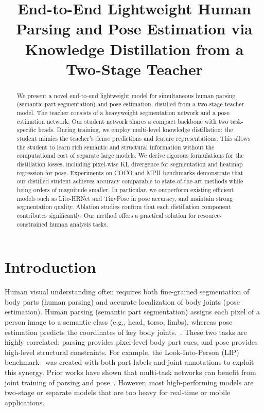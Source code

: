 \documentclass{article}
\begin{document}
\title{End-to-End Lightweight Human Parsing and Pose Estimation via Knowledge Distillation from a Two-Stage Teacher}
\maketitle

\begin{abstract}
We present a novel end-to-end lightweight model for simultaneous human parsing (semantic part segmentation) and pose estimation, distilled from a two-stage teacher model. The teacher consists of a heavyweight segmentation network and a pose estimation network. Our student network shares a compact backbone with two task-specific heads. During training, we employ multi-level knowledge distillation: the student mimics the teacher’s dense predictions and feature representations. This allows the student to learn rich semantic and structural information without the computational cost of separate large models. We derive rigorous formulations for the distillation losses, including pixel-wise KL divergence for segmentation and heatmap regression for pose. Experiments on COCO and MPII benchmarks demonstrate that our distilled student achieves accuracy comparable to state-of-the-art methods while being orders of magnitude smaller. In particular, we outperform existing efficient models such as Lite-HRNet and TinyPose in pose accuracy, and maintain strong segmentation quality. Ablation studies confirm that each distillation component contributes significantly. Our method offers a practical solution for resource-constrained human analysis tasks.
\end{abstract}

\section{Introduction}
Human visual understanding often requires both fine-grained segmentation of body parts (human parsing) and accurate localization of body joints (pose estimation). Human parsing (semantic part segmentation) assigns each pixel of a person image to a semantic class (e.g., head, torso, limbs), whereas pose estimation predicts the coordinates of key body joints.~\cite{liang2018lip}. These two tasks are highly correlated: parsing provides pixel-level body part cues, and pose provides high-level structural constraints. For example, the Look-Into-Person (LIP) benchmark~\cite{liang2018lip} was created with both part labels and joint annotations to exploit this synergy. Prior works have shown that multi-task networks can benefit from joint training of parsing and pose~\cite{liang2018lip,chang2018graphonomy}. However, most high-performing models are two-stage or separate models that are too heavy for real-time or mobile applications.
\end{document}
